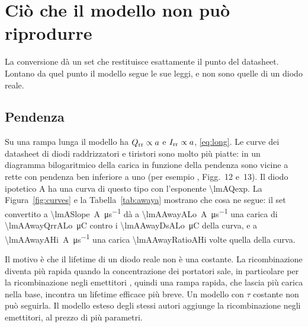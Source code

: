 \documentclass[10pt,a4paper]{scrartcl}
\let\newcommand\lmitdefine
\newcommand{\Irr}{I_\mathrm{rr}}
\newcommand{\Qrr}{Q_\mathrm{rr}}
\begin{document}
\section{Ciò che il modello non può riprodurre}
\label{sec:limits}
La conversione dà un set che restituisce esattamente il punto del datasheet. Lontano da quel punto il modello segue le sue leggi, e non sono quelle di un diodo reale.

\subsection{Pendenza}
\label{sec:slope}
Su una rampa lunga il modello ha $\Qrr \propto a$ e $\Irr \propto a$, \eqref{eq:long}. Le curve dei datasheet di diodi raddrizzatori e tiristori sono molto più piatte: in un diagramma bilogaritmico della carica in funzione della pendenza sono vicine a rette con pendenza ben inferiore a uno (per esempio \cite{an5950}, Figg.~12 e~13). Il diodo ipotetico A ha una curva di questo tipo con l'esponente \num{\lmAQexp}. La Figura~\ref{fig:curves} e la Tabella~\ref{tab:awaya} mostrano che cosa ne segue: il set convertito a \SI{\lmASlope}{\ampere\per\micro\second} dà a \SI{\lmAAwayALo}{\ampere\per\micro\second} una carica di \SI{\lmAAwayQrrALo}{\micro\coulomb} contro i \SI{\lmAAwayDsALo}{\micro\coulomb} della curva, e a \SI{\lmAAwayAHi}{\ampere\per\micro\second} una carica \num{\lmAAwayRatioAHi} volte quella della curva.

Il motivo è che il lifetime di un diodo reale non è una costante. La ricombinazione diventa più rapida quando la concentrazione dei portatori sale, in particolare per la ricombinazione negli emettitori \cite{schlangenotto1969}, quindi una rampa rapida, che lascia più carica nella base, incontra un lifetime efficace più breve. Un modello con $\tau$ costante non può seguirla. Il modello esteso degli stessi autori \cite{ma1993} aggiunge la ricombinazione negli emettitori, al prezzo di più parametri.
\end{document}
